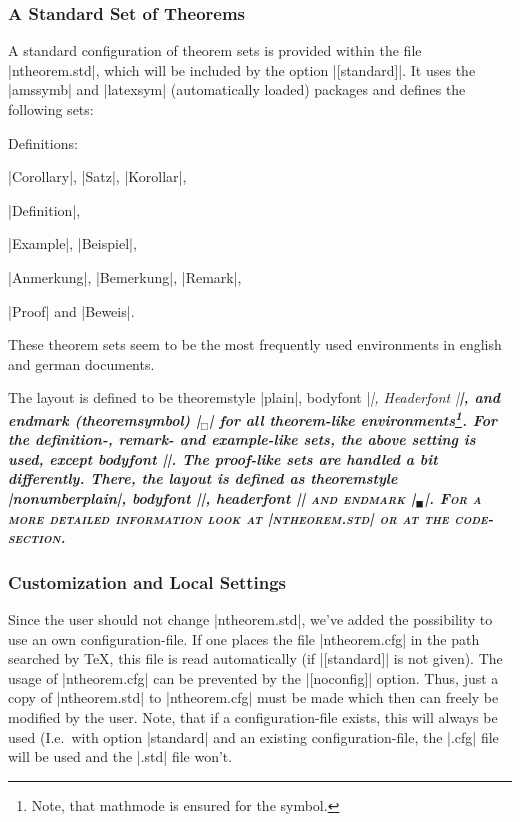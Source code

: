 \documentclass[11pt,oneside]{ltxdoc}
\theoremstyle{marginbreak}
\theoremstyle{changebreak}
\theoremstyle{change}
\theoremstyle{plain}
\theoremstyle{nonumberplain}
\begin{document}
\subsubsection{A Standard Set of Theorems}\label{sec:standard}

A standard configuration of theorem sets is provided within
the file |ntheorem.std|, which will be included by the option
|[standard]|. It uses the |amssymb| and |latexsym| (automatically
loaded) packages and defines the following sets:
\begin{nlist}{Definitions:}
 \item[Theorems:] %
  |Corollary|, |Satz|, |Korollar|,
 \item[Definitions:] |Definition|,
 \item[Examples:] |Example|, |Beispiel|,
 \item[Remarks:] |Anmerkung|, |Bemerkung|, |Remark|,
 \item[Proofs:] |Proof| and |Beweis|.
\end{nlist}
These theorem sets seem to be the most frequently used environments 
in english and german
documents.

The layout is defined to be theoremstyle |plain|, bodyfont |\itshape|,
Headerfont |\bfseries|, and endmark (theoremsymbol)
|\ensuremath{_\Box}| for all theorem-like environments\footnote{Note, 
that mathmode is ensured for the symbol.}.
For the definition-, remark- and example-like sets,
the above setting is used, except bodyfont |\upshape|.
The proof-like sets are handled a bit differently. There, the layout 
is defined as theoremstyle |nonumberplain|, bodyfont |\upshape|,
headerfont |\scshape| and endmark |\ensuremath{_\blacksquare}|. 
For a more detailed information look at 
|ntheorem.std| or at the code-section.

\subsubsection{Customization and Local Settings}

Since the user should not change |ntheorem.std|,
we've added the possibility to use an own configuration-file.
If one places the file |ntheorem.cfg| in the path searched by
\TeX, this file is read automatically (if |[standard]|
is not given). The usage of |ntheorem.cfg| can be prevented by the
|[noconfig]| option. Thus, just
a copy of |ntheorem.std| to |ntheorem.cfg| must be made
which then can freely be modified by the user. Note, that if a 
configuration-file exists, this will always be used (I.e.\ with 
option |standard| and an existing configuration-file, the |.cfg| 
file will be used and the |.std| file won't.
\end{document}

